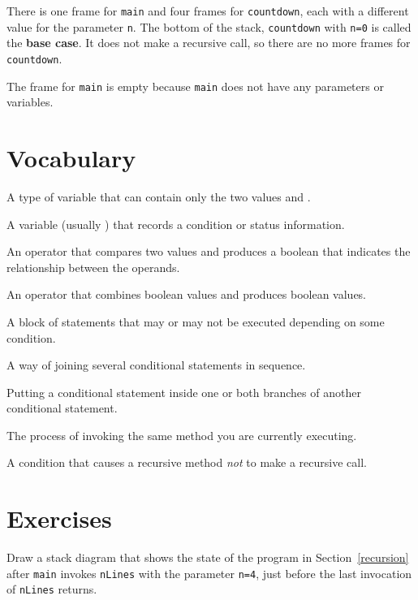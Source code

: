 \documentclass[12pt]{book}
\begin{document}
There is one frame for {\tt main} and four frames for {\tt countdown}, each with a different value for the parameter {\tt n}.
The bottom of the stack, {\tt countdown} with {\tt n=0} is called the {\bf base case}.
It does not make a recursive call, so there are no more frames for {\tt countdown}.

The frame for {\tt main} is empty because {\tt main} does not have any parameters or variables.


\section{Vocabulary}

\begin{description}

A type of variable that can contain only the two values  and .

A variable (usually ) that records a condition or status information.

An operator that compares two values and produces a boolean that indicates the relationship between the operands.

An operator that combines boolean values and produces boolean values.

A block of statements that may or may not be executed depending on some condition.

A way of joining several conditional statements in sequence.

Putting a conditional statement inside one or both branches of another conditional statement.

The process of invoking the same method you are currently executing.

A condition that causes a recursive method {\em not} to make a recursive call.

\end{description}


\section{Exercises}

\begin{exercise}
Draw a stack diagram that shows the state of the program in Section~\ref{recursion} after {\tt main} invokes {\tt nLines} with the parameter {\tt n=4}, just before the last invocation of {\tt nLines} returns.
\end{exercise}
\end{document}
